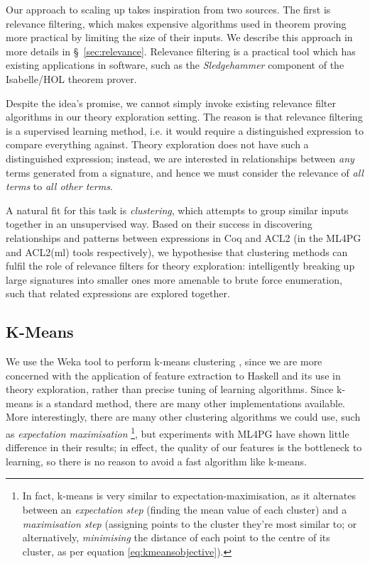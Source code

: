 Our approach to scaling up \quickspec{} takes inspiration from two sources. The
first is relevance filtering, which makes expensive algorithms used in theorem
proving more practical by limiting the size of their inputs. We describe this
approach in more details in \S~\ref{sec:relevance}. Relevance filtering is a
practical tool which has existing applications in software, such as the
\emph{Sledgehammer} component of the Isabelle/HOL theorem prover.

Despite the idea's promise, we cannot simply invoke existing relevance filter
algorithms in our theory exploration setting. The reason is that relevance
filtering is a supervised learning method, i.e. it would require a distinguished
expression to compare everything against. Theory exploration does not have such
a distinguished expression; instead, we are interested in relationships between
\emph{any} terms generated from a signature, and hence we must consider the
relevance of \emph{all terms} to \emph{all other terms}.

A natural fit for this task is \emph{clustering}, which attempts to group
similar inputs together in an unsupervised way. Based on their success in
discovering relationships and patterns between expressions in Coq and ACL2 (in
the ML4PG and ACL2(ml) tools respectively), we hypothesise that clustering
methods can fulfil the role of relevance filters for theory exploration:
intelligently breaking up large signatures into smaller ones more amenable to
brute force enumeration, such that related expressions are explored together.

\subsection{K-Means}

We use the Weka tool to perform k-means clustering
\cite{Holmes.Donkin.Witten:1994}, since we are more concerned with the
application of feature extraction to Haskell and its use in theory exploration,
rather than precise tuning of learning algorithms. Since k-means is a standard
method, there are many other implementations available. More interestingly,
there are many other clustering algorithms we could use, such as
\emph{expectation maximisation} \footnote{In fact, k-means is very similar to
  expectation-maximisation, as it alternates between an \emph{expectation step}
  (finding the mean value of each cluster) and a \emph{maximisation step}
  (assigning points to the cluster they're most similar to; or alternatively,
  \emph{minimising} the distance of each point to the centre of its cluster, as
  per equation \ref{eq:kmeansobjective}).}, but experiments with ML4PG have
shown little difference in their results; in effect, the quality of our features
is the bottleneck to learning, so there is no reason to avoid a fast algorithm
like k-means.

